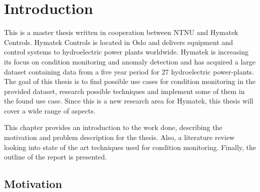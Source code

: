 \chapter{Introduction}\label{cha:introduction}
%

This is a master thesis written in cooperation between NTNU and Hymatek Controls. Hymatek Controls is located in Oslo and delivers equipment and control systems to hydroelectric power plants worldwide. Hymatek is increasing its focus on condition monitoring and anomaly detection and has acquired a large dataset containing data from a five year period for $27$ hydroelectric power-plants. The goal of this thesis is to find possible use cases for condition monitoring in the provided dataset, research possible techniques and implement some of them in the found use case. Since this is a new research area for Hymatek, this thesis will cover a wide range of aspects. 

This chapter provides an introduction to the work done, describing the motivation and problem description for the thesis. Also, a literature review looking into state of the art techniques used for condition monitoring. Finally, the outline of the report is presented. 


\section{Motivation}\label{sec:motivation}


